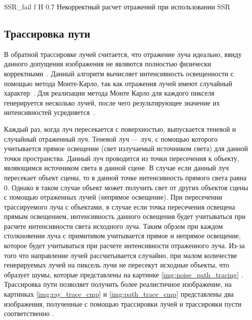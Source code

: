 {SSR_fail} %
{f} %
{H} %
{0.7\textwidth} %
{Некорректный расчет отражений при использовании SSR} %





\subsection{Трассировка пути}
В обратной трассировке лучей считается, что отражение луча идеально, ввиду данного допущения
изображения не являются полностью физически корректными~\cite{path_tracing}.
Данный алгоритм вычисляет интенсивность освещенности с помощью метода Монте-Карло, так как отражения лучей имеют случайный характер~\cite{monte_carlo}.
Для реализации метода Монте Карло  для каждого пикселя генерируется несколько  лучей,
после чего результирующее значение их интенсивностей усредняется~\cite{path_tracing_def}.

Каждый раз, когда луч пересекается с поверхностью, выпускается теневой и случайный отраженный луч.
Теневой луч --- луч, с помощью которого учитывается прямое освещение (свет излучаемый источником света) для данной точки пространства. Данный луч проводится из 
точки пересечения к объекту, являющимся источником света в данной сцене. В случае если данный луч пересекает объект сцены, то в данной точке интенсивность
прямого света равна 0. Однако в таком случае объект может получить свет от других объектов сцены с помощью отраженных лучей (непрямое освещение). При пересечении трассируемого луча
с объектами, в случае если  точка пересечения освещена прямым освещением, интенсивность данного освещения будет учитываться при расчете интенсивности света исходного луча.
Таким обрзом при каждом столкновении луча с примитивом учитывается прямое и непрямое освещение, которое будет учитываться при расчете интенсивности отраженного луча.
Из-за того что направление лучей рассчитывается случайно, при малом количестве генерируемых лучей на пиксель лучи не пересекут исходные объекты, что образует шумы, которые 
представлены на картинке \ref{img:noise_path_tracing} \cite{path_tracing, ray_path_tracing}.
Трассировка пути позволяет получить более реалистичное изображение, на картинках \ref{img:ray_trace_cmp} и \ref{img:path_trace_cmp} представлены два изображения,
полученные с помощью трассировки лучей и трассировки пусти соответственно \cite{cyber_trce}.




